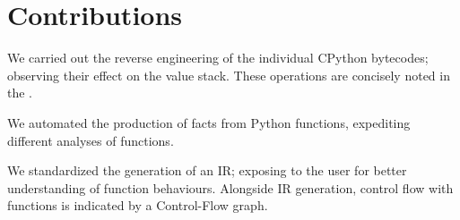    \section{Contributions}
    \par We carried out the reverse engineering of the individual CPython bytecodes; observing their effect on the value stack. These operations are concisely noted
    in the .
    \par We automated the production of facts from Python functions, expediting different analyses of functions.
    \par We standardized the generation of an IR; exposing to the user for better understanding of function behaviours. Alongside IR generation, control flow with functions
    is indicated by a Control-Flow graph.